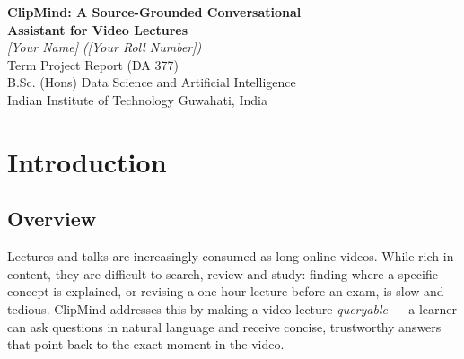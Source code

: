 \documentclass[11pt,a4paper]{article}
\begin{document}
\begin{center}
  {\LARGE \textbf{ClipMind: A Source-Grounded Conversational\\[2pt]
  Assistant for Video Lectures}}\\[1.1em]
  {\large \textit{[Your Name] ([Your Roll Number])}}\\[0.45em]
  {\normalsize Term Project Report (DA 377)}\\[1.2em]
  {\normalsize B.Sc. (Hons) Data Science and Artificial Intelligence}\\[0.25em]
  {\normalsize Indian Institute of Technology Guwahati, India}
\end{center}
\vspace{1.4em}

\begin{abstract}
\noindent
\textbf{ClipMind} turns any YouTube lecture into an interactive, source-grounded study
assistant. Given a video link, the system obtains a time-stamped transcript (from the
video's captions when available, otherwise by automatic speech recognition), indexes it
using a Retrieval-Augmented Generation (RAG) pipeline, and then lets the user
\emph{chat with the video} and generate a summary, automatic chapters, study notes,
quizzes, keywords and named entities. Crucially, every answer is \emph{grounded in the
transcript} and linked to the exact moment in the video: clicking a cited timestamp
seeks the embedded player to that point. The application is built as a FastAPI backend
and a React single-page frontend. Language understanding is provided by a Large Language
Model served through Groq, retrieval uses Sentence-Transformers embeddings with a FAISS
vector index, and speech recognition uses Whisper. The design is provider-agnostic and
can be reconfigured to use Gemini, OpenAI or a local model without code changes.
\end{abstract}

\newpage
\tableofcontents
\newpage

\section{Introduction}

\subsection{Overview}
Lectures and talks are increasingly consumed as long online videos. While rich in
content, they are difficult to search, review and study: finding where a specific
concept is explained, or revising a one-hour lecture before an exam, is slow and tedious.
ClipMind addresses this by making a video lecture \emph{queryable} --- a learner can ask
questions in natural language and receive concise, trustworthy answers that point back to
the exact moment in the video.
\end{document}
